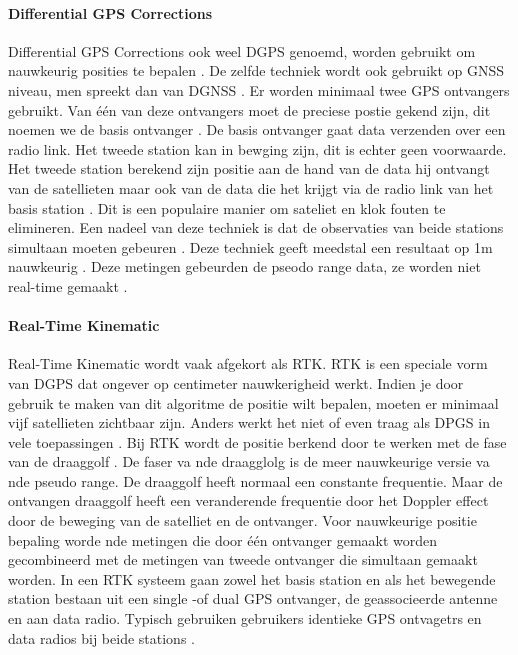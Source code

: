 \paragraph{Differential GPS Corrections}
Differential GPS Corrections ook weel DGPS genoemd, worden gebruikt om nauwkeurig posities  te bepalen \cite{LBibGLONASS2}. De zelfde techniek wordt ook gebruikt op GNSS niveau, men spreekt dan van DGNSS \cite{LBibGNSS8}. Er worden minimaal twee GPS ontvangers gebruikt. Van \'e\'en van deze ontvangers moet de preciese postie gekend zijn, dit noemen we de basis ontvanger \cite{LBibGNSS2,LBibRTK}. De basis ontvanger gaat data verzenden over een radio link.  Het tweede station kan in bewging zijn, dit is echter geen voorwaarde. Het tweede station berekend zijn positie aan de hand van de data hij ontvangt van de satellieten maar ook van de data die het krijgt via de radio link van het basis station \cite{LBibRTK}. Dit is een populaire manier om sateliet en klok fouten te elimineren. Een nadeel van deze techniek is dat de observaties van beide stations simultaan moeten gebeuren \cite{LBibGNSS2}. Deze techniek geeft meedstal een resultaat op 1m nauwkeurig \cite{LBibRTK}. Deze metingen gebeurden de pseodo range data, ze worden niet real-time gemaakt \cite{LBibRTK3}.

\paragraph{Real-Time Kinematic}
Real-Time Kinematic wordt vaak afgekort als RTK. RTK is een speciale vorm van DGPS dat ongever op centimeter nauwkerigheid werkt. Indien je door gebruik te maken van dit algoritme de positie wilt bepalen, moeten er minimaal vijf satellieten zichtbaar zijn. Anders werkt het niet of even traag als DPGS in vele toepassingen \cite{LBibRTK}. Bij RTK wordt de positie berkend door te werken met de fase van de draaggolf \cite{LBibRTK2}. De faser va nde draagglolg is de meer nauwkeurige versie va nde pseudo range. De draaggolf heeft normaal een constante frequentie. Maar de ontvangen draaggolf heeft een veranderende frequentie door het Doppler effect door de beweging van de satelliet en de ontvanger. Voor nauwkeurige positie bepaling worde nde metingen die door \'e\'en ontvanger gemaakt worden gecombineerd met de metingen van tweede ontvanger die simultaan gemaakt worden. In een RTK systeem gaan zowel het basis station en als het bewegende station bestaan uit een single -of dual GPS ontvanger, de geassocieerde antenne en aan data radio. Typisch gebruiken gebruikers identieke GPS ontvagetrs en data radios bij beide stations \cite{LBibRTK3}. 


